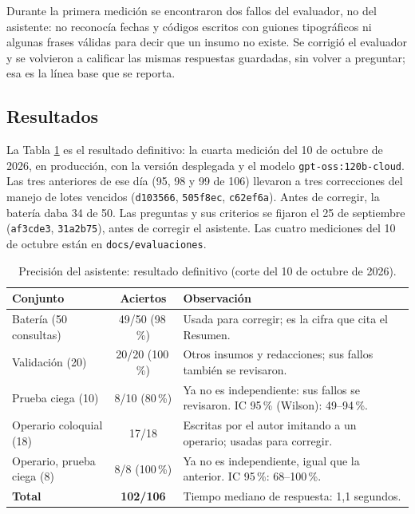 Durante la primera medición se encontraron dos fallos del evaluador, no del asistente: no reconocía fechas y códigos escritos con guiones tipográficos ni algunas frases válidas para decir que un insumo no existe. Se corrigió el evaluador y se volvieron a calificar las mismas respuestas guardadas, sin volver a preguntar; esa es la línea base que se reporta.

\subsection{Resultados}

La Tabla \ref{tab:pru_asistente} es el resultado definitivo: la cuarta medición del 10 de octubre de 2026, en producción, con la versión desplegada y el modelo \texttt{gpt-oss:120b-cloud}. Las tres anteriores de ese día (95, 98 y 99 de 106) llevaron a tres correcciones del manejo de lotes vencidos (\texttt{d103566}, \texttt{505f8ec}, \texttt{c62ef6a}). Antes de corregir, la batería daba 34 de 50. Las preguntas y sus criterios se fijaron el 25 de septiembre (\texttt{af3cde3}, \texttt{31a2b75}), antes de corregir el asistente. Las cuatro mediciones del 10 de octubre están en \texttt{docs/evaluaciones}.

\begin{table}[!htbp]
\centering
\caption{Precisión del asistente: resultado definitivo (corte del 10 de octubre de 2026).}
\label{tab:pru_asistente}
\begin{tabular}{|p{4.6cm}|c|p{7.4cm}|}
\hline
\textbf{Conjunto} & \textbf{Aciertos} & \textbf{Observación} \\
\hline
Batería (50 consultas) & 49/50 (98\,\%) & Usada para corregir; es la cifra que cita el Resumen. \\ \hline
Validación (20) & 20/20 (100\,\%) & Otros insumos y redacciones; sus fallos también se revisaron. \\ \hline
Prueba ciega (10) & 8/10 (80\,\%) & Ya no es independiente: sus fallos se revisaron. IC 95\,\% (Wilson): 49--94\,\%. \\ \hline
Operario coloquial (18) & 17/18 & Escritas por el autor imitando a un operario; usadas para corregir. \\ \hline
Operario, prueba ciega (8) & 8/8 (100\,\%) & Ya no es independiente, igual que la anterior. IC 95\,\%: 68--100\,\%. \\ \hline
\textbf{Total} & \textbf{102/106} & Tiempo mediano de respuesta: 1,1 segundos. \\ \hline
\end{tabular}
\end{table}

